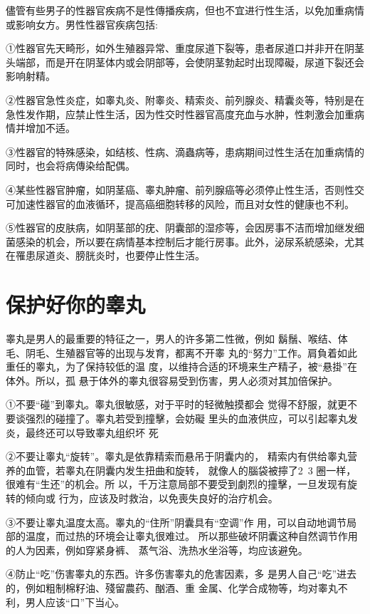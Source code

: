 \documentclass[12pt,UTF8]{ctexbook}
\begin{document}
儘管有些男子的性器官疾病不是性傳播疾病，但也不宜进行性生活，以免加重病情或影响女方。男性性器官疾病包括:

①性器官先天畸形，如外生殖器异常、重度尿道下裂等，患者尿道口并非开在阴茎头端部，而是开在阴茎体内或会阴部等，会使阴茎勃起时出现障礙，尿道下裂还会影响射精。

②性器官急性炎症，如睾丸炎、附睾炎、精索炎、前列腺炎、精囊炎等，特别是在急性发作期，应禁止性生活，因为性交时性器官高度充血与水肿，性刺激会加重病情并增加不适。

③性器官的特殊感染，如结核、性病、滴蟲病等，患病期间过性生活在加重病情的同时，也会将病傳染给配偶。

④某些性器官肿瘤，如阴茎癌、睾丸肿瘤、前列腺癌等必须停止性生活，否则性交可加速性器官的血液循环，提高癌细胞转移的风险，而且对女性的健康也不利。

⑤性器官的皮肤病，如阴茎部的疣、阴囊部的湿疹等，会因房事不洁而增加继发细菌感染的机会，所以要在病情基本控制后才能行房事。此外，泌尿系統感染，尤其在罹患尿道炎、膀胱炎时，也要停止性生活。

\section{保护好你的睾丸}

睾丸是男人的最重要的特征之一，男人的许多第二性微，例如
鬍鬚、喉结、体毛、阴毛、生殖器官等的出现与发育，都离不开睾
丸的“努力”工作。肩負着如此重任的睾丸，为了保持较低的温
度，以维持合适的环境来生产精子，被“悬掛”在体外。所以，孤
悬于体外的睾丸很容易受到伤害，男人必须对其加倍保护。

①不要“碰”到睾丸。睾丸很敏感，对于平时的轻微触摸都会
觉得不舒服，就更不要谈强烈的碰撞了。睾丸若受到撞擊，会妨礙
里头的血液供应，可以引起睾丸发炎，最终还可以导致睾丸组织坏
死

②不要让睾丸“旋转”。睾丸是依靠精索而悬吊于阴囊内的，
精索内有供给睾丸营养的血管，若睾丸在阴囊内发生扭曲和旋转，
就像人的腦袋被擰了2~3 圈一样，很难有“生还”的机会。所
以，千万注意局部不要受到劇烈的撞擊，一旦发现有旋转的倾向或
行为，应该及时救治，以免喪失良好的治疗机会。

③不要让睾丸温度太高。睾丸的“住所”阴囊具有“空调”作
用，可以自动地调节局部的温度，而过热的环境会让睾丸很难过。
所以那些破坏阴囊这种自然调节作用的人为因素，例如穿紧身裤、
蒸气浴、洗热水坐浴等，均应该避免。

④防止“吃”伤害睾丸的东西。许多伤害睾丸的危害因素，多
是男人自己“吃”进去的，例如粗制棉籽油、殘留農药、酗酒、重
金属、化学合成物等，均对睾丸不利，男人应该“口”下当心。
\end{document}
